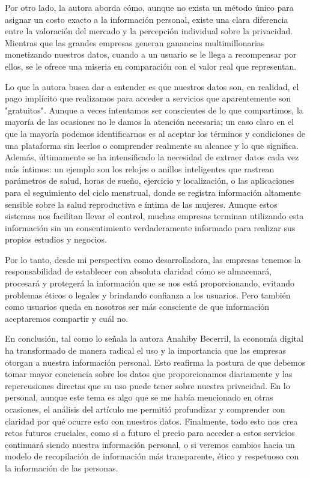 Por otro lado, la autora aborda cómo, aunque no exista un método único para asignar un costo exacto a la información personal, existe una clara diferencia entre la valoración del mercado y la percepción individual sobre la privacidad. Mientras que las grandes empresas generan ganancias multimillonarias monetizando nuestros datos, cuando a un usuario se le llega a recompensar por ellos, se le ofrece una miseria en comparación con el valor real que representan. 

Lo que la autora busca dar a entender es que nuestros datos son, en realidad, el pago implícito que realizamos para acceder a servicios que aparentemente son "gratuitos". Aunque a veces intentamos ser conscientes de lo que compartimos, la mayoría de las ocasiones no le damos la atención necesaria; un caso claro en el que la mayoría podemos identificarnos es al aceptar los términos y condiciones de una plataforma sin leerlos o comprender realmente su alcance y lo que significa. Además, últimamente se ha intensificado la necesidad de extraer datos cada vez más íntimos: un ejemplo son los relojes o anillos inteligentes que rastrean parámetros de salud, horas de sueño, ejercicio y localización, o las aplicaciones para el seguimiento del ciclo menstrual, donde se registra información altamente sensible sobre la salud reproductiva e íntima de las mujeres. Aunque estos sistemas nos facilitan llevar el control, muchas empresas terminan utilizando esta información sin un consentimiento verdaderamente informado para realizar sus propios estudios y negocios. 

Por lo tanto, desde mi perspectiva como desarrolladora, las empresas tenemos la responsabilidad de establecer con absoluta claridad cómo se almacenará, procesará y protegerá la información que se nos está proporcionando, evitando problemas éticos o legales y brindando confianza a los usuarios. Pero también como usuarios queda en nosotros ser más consciente de que información aceptaremos compartir y cuál no.

En conclusión, tal como lo señala la autora Anahiby Becerril, la economía digital ha transformado de manera radical el uso y la importancia que las empresas otorgan a nuestra información personal. Esto reafirma la postura de que debemos tomar mayor conciencia sobre los datos que proporcionamos diariamente y las repercusiones directas que su uso puede tener sobre nuestra privacidad. En lo personal, aunque este tema es algo que se me había mencionado en otras ocasiones, el análisis del artículo me permitió profundizar y comprender con claridad por qué ocurre esto con nuestros datos. Finalmente, todo esto nos crea retos futuros cruciales, como si a futuro el precio para acceder a estos servicios continuará siendo nuestra información personal, o si veremos cambios hacia un modelo de recopilación de información más transparente, ético y respetuoso con la información de las personas. 
